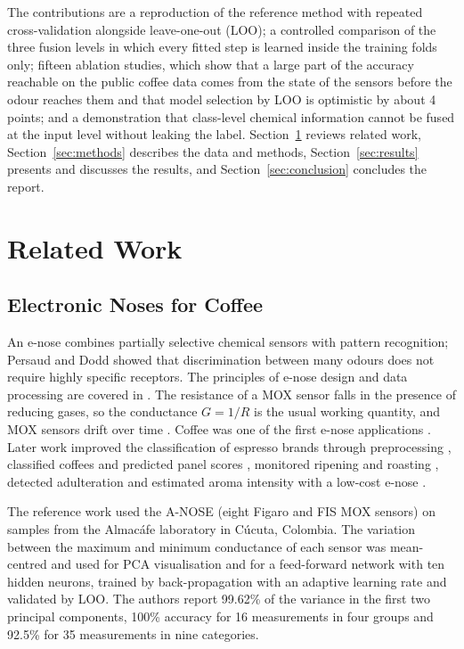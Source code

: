 \documentclass[12pt]{article}
\begin{document}
The contributions are a reproduction of the reference method with repeated cross-validation alongside leave-one-out (LOO); a controlled comparison of the three fusion levels in which every fitted step is learned inside the training folds only; fifteen ablation studies, which show that a large part of the accuracy reachable on the public coffee data comes from the state of the sensors before the odour reaches them and that model selection by LOO is optimistic by about 4 points; and a demonstration that class-level chemical information cannot be fused at the input level without leaking the label. Section~\ref{sec:related} reviews related work, Section~\ref{sec:methods} describes the data and methods, Section~\ref{sec:results} presents and discusses the results, and Section~\ref{sec:conclusion} concludes the report.
\clearpage

\section{Related Work}
\label{sec:related}

\subsection{Electronic Noses for Coffee}

An e-nose combines partially selective chemical sensors with pattern recognition; Persaud and Dodd \cite{persaud1982analysis} showed that discrimination between many odours does not require highly specific receptors. The principles of e-nose design and data processing are covered in \cite{gardner1999electronic,marco2012signal}. The resistance of a MOX sensor falls in the presence of reducing gases, so the conductance $G = 1/R$ is the usual working quantity, and MOX sensors drift over time \cite{vergara2012chemical}. Coffee was one of the first e-nose applications \cite{gardner1992application}. Later work improved the classification of espresso brands through preprocessing \cite{pardo2000data}, classified coffees and predicted panel scores \cite{pardo2002coffee}, monitored ripening and roasting \cite{falasconi2005novel,romani2012evaluation}, detected adulteration \cite{brudzewski2012recognition} and estimated aroma intensity with a low-cost e-nose \cite{gonzalezviejo2021integrating}.

The reference work \cite{rodriguez2010electronic} used the A-NOSE (eight Figaro and FIS MOX sensors) on samples from the Almac\'{a}fe laboratory in C\'{u}cuta, Colombia. The variation between the maximum and minimum conductance of each sensor was mean-centred and used for PCA visualisation and for a feed-forward network with ten hidden neurons, trained by back-propagation with an adaptive learning rate and validated by LOO. The authors report 99.62\% of the variance in the first two principal components, 100\% accuracy for 16 measurements in four groups and 92.5\% for 35 measurements in nine categories.
\end{document}
